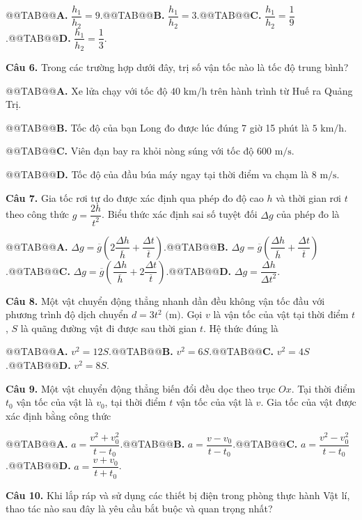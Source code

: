\documentclass{article}
\begin{document}
@@TAB@@\textbf{A.} $\dfrac{h_1}{h_2} = 9$.@@TAB@@\textbf{B.} $\dfrac{h_1}{h_2} = 3$.@@TAB@@\textbf{C.} $\dfrac{h_1}{h_2} = \dfrac{1}{9}$.@@TAB@@\textbf{D.} $\dfrac{h_1}{h_2} = \dfrac{1}{3}$.

\textbf{Câu 6.} Trong các trường hợp dưới đây, trị số vận tốc nào là tốc độ trung bình?

@@TAB@@\textbf{A.} Xe lửa chạy với tốc độ $40\text{ km/h}$ trên hành trình từ Huế ra Quảng Trị.

@@TAB@@\textbf{B.} Tốc độ của bạn Long đo được lúc đúng 7 giờ 15 phút là $5\text{ km/h}$.

@@TAB@@\textbf{C.} Viên đạn bay ra khỏi nòng súng với tốc độ $600\text{ m/s}$.

@@TAB@@\textbf{D.} Tốc độ của đầu búa máy ngay tại thời điểm va chạm là $8\text{ m/s}$.

\textbf{Câu 7.} Gia tốc rơi tự do được xác định qua phép đo độ cao $h$ và thời gian rơi $t$ theo công thức $g = \dfrac{2h}{t^2}$. Biểu thức xác định sai số tuyệt đối $\Delta g$ của phép đo là

@@TAB@@\textbf{A.} $\Delta g = \overline{g}\left(2\dfrac{\Delta h}{\overline{h}} + \dfrac{\Delta t}{\overline{t}}\right)$.@@TAB@@\textbf{B.} $\Delta g = \overline{g}\left(\dfrac{\Delta h}{\overline{h}} + \dfrac{\Delta t}{\overline{t}}\right)$.@@TAB@@\textbf{C.} $\Delta g = \overline{g}\left(\dfrac{\Delta h}{\overline{h}} + 2\dfrac{\Delta t}{\overline{t}}\right)$.@@TAB@@\textbf{D.} $\Delta g = \dfrac{\Delta h}{\Delta t^2}$.

\textbf{Câu 8.} Một vật chuyển động thẳng nhanh dần đều không vận tốc đầu với phương trình độ dịch chuyển $d = 3t^2\text{ (m)}$. Gọi $v$ là vận tốc của vật tại thời điểm $t$, $S$ là quãng đường vật đi được sau thời gian $t$. Hệ thức đúng là

@@TAB@@\textbf{A.} $v^2 = 12S$.@@TAB@@\textbf{B.} $v^2 = 6S$.@@TAB@@\textbf{C.} $v^2 = 4S$.@@TAB@@\textbf{D.} $v^2 = 8S$.

\textbf{Câu 9.} Một vật chuyển động thẳng biến đổi đều dọc theo trục $Ox$. Tại thời điểm $t_0$ vận tốc của vật là $v_0$, tại thời điểm $t$ vận tốc của vật là $v$. Gia tốc của vật được xác định bằng công thức

@@TAB@@\textbf{A.} $a = \dfrac{v^2 + v_0^2}{t - t_0}$.@@TAB@@\textbf{B.} $a = \dfrac{v - v_0}{t - t_0}$.@@TAB@@\textbf{C.} $a = \dfrac{v^2 - v_0^2}{t - t_0}$.@@TAB@@\textbf{D.} $a = \dfrac{v + v_0}{t + t_0}$.

\textbf{Câu 10.} Khi lắp ráp và sử dụng các thiết bị điện trong phòng thực hành Vật lí, thao tác nào sau đây là yêu cầu bắt buộc và quan trọng nhất?
\end{document}
